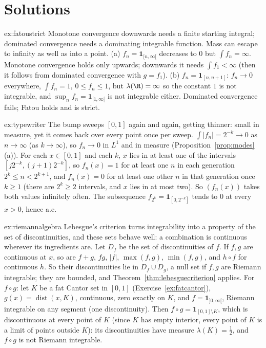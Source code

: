 \section{Solutions}

\begin{solution}{ex:fatoustrict}
\idea Monotone convergence downwards needs a finite starting integral; dominated convergence needs a dominating integrable function. Mass can escape to infinity
as well as into a point.
\writeup (a) $f_n=\mathbf 1_{[n,\infty[}$ decreases to $0$ but $\int f_n=\infty$. Monotone convergence holds only upwards; downwards it needs $\int f_1<\infty$ (then it follows from
dominated convergence with $g=f_1$). (b) $f_n=\mathbf 1_{[n,n+1]}$: $f_n\to0$ everywhere, $\int f_n=1$, $0\le f_n\le1$, but $\lambda(\R)=\infty$ so the constant $1$ is not integrable, and $\sup_nf_n=\mathbf 1_{[1,\infty[}$ is not
integrable either. Dominated convergence fails; Fatou holds and is strict.
\end{solution}

\begin{solution}{ex:typewriter}
\idea The bump sweeps $[0,1]$ again and again, getting thinner: small in measure, yet it comes back over every point once per sweep.
\writeup $\int|f_n|=2^{-k}\to0$ as $n\to\infty$ (as $k\to\infty$), so $f_n\to0$ in $L^1$ and in measure (Proposition~\ref{prop:modes}(a)). For each $x\in[0,1]$ and each $k$, $x$ lies in at least one of the
intervals $[j2^{-k},(j+1)2^{-k}]$, so $f_n(x)=1$ for at least one $n$ in each generation $2^k\le n<2^{k+1}$, and $f_n(x)=0$ for at least one other $n$ in that generation once $k\ge1$ (there are $2^k\ge2$
intervals, and $x$ lies in at most two). So $(f_n(x))$ takes both values infinitely often. The subsequence $f_{2^k}=\mathbf 1_{[0,2^{-k}]}$ tends to $0$ at every $x>0$, hence a.e.
\end{solution}

\begin{solution}{ex:riemannalgebra}
\idea Lebesgue's criterion turns integrability into a property of the set of discontinuities, and these sets behave well: a combination is continuous
wherever its ingredients are.
\writeup Let $D_f$ be the set of discontinuities of $f$. If $f,g$ are continuous at $x$, so are $f+g$, $fg$, $|f|$, $\max(f,g)$, $\min(f,g)$, and $h\circ f$ for continuous $h$. So their
discontinuities lie in $D_f\cup D_g$, a null set if $f,g$ are Riemann integrable; they are bounded, and Theorem~\ref{thm:lebesguecriterion} applies. For $f\circ g$: let $K$ be a fat
Cantor set in $[0,1]$ (Exercise~\ref{ex:fatcantor}), $g(x)=\operatorname{dist}(x,K)$, continuous, zero exactly on $K$, and $f=\mathbf 1_{]0,\infty[}$, Riemann integrable on any segment (one
discontinuity). Then $f\circ g=\mathbf 1_{[0,1]\setminus K}$, which is discontinuous at every point of $K$ (since $K$ has empty interior, every point of $K$ is a limit of points outside $K$):
its discontinuities have measure $\lambda(K)=\frac12$, and $f\circ g$ is not Riemann integrable.
\end{solution}

